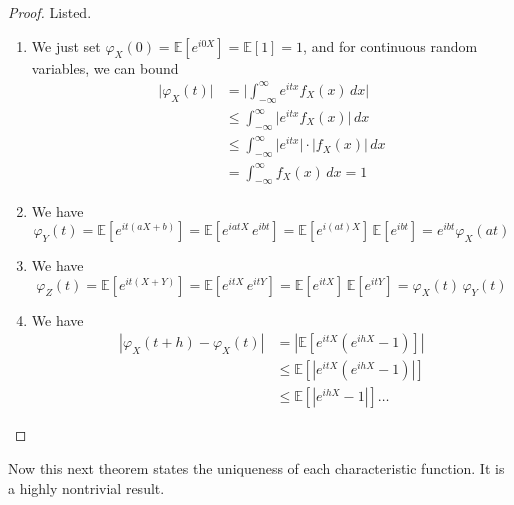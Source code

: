 \documentclass{article}
\begin{document}
      \begin{proof}
        Listed. 
        \begin{enumerate}
          \item We just set $\varphi_X (0) = \mathbb{E}[e^{i 0 X}] = \mathbb{E}[1] = 1$, and for continuous random variables, we can bound 
          \begin{align*}
            \big| \varphi_X (t) \big| & = \bigg| \int_{-\infty}^\infty e^{i t x} f_X (x) \,dx  \bigg| \\
            & \leq \int_{-\infty}^\infty \big| e^{i t x} f_X (x) \big| \,dx \\
            & \leq \int_{-\infty}^\infty \big| e^{i t x} \big| \cdot \big|f_X (x) \big| \,dx \\
            & = \int_{-\infty}^\infty f_X (x) \,dx = 1 
          \end{align*}
          
          \item We have 
          \begin{equation}
            \varphi_Y (t) = \mathbb{E}[ e^{i t (a X + b)}] = \mathbb{E}[ e^{i a t X} \, e^{i b t}] = \mathbb{E}[ e^{i (at) X}] \, \mathbb{E}[e^{i b t}] = e^{i b t} \varphi_X (a t)
          \end{equation}
          
          \item We have 
          \begin{equation}
            \varphi_Z (t) = \mathbb{E}[ e^{i t (X + Y)}] = \mathbb{E}[ e^{i t X} \, e^{i t Y}] = \mathbb{E}[e^{i t X}] \, \mathbb{E}[e^{i t Y}] = \varphi_X (t) \, \varphi_Y (t)
          \end{equation}
          
          \item We have 
          \begin{align*}
            | \varphi_X (t + h) - \varphi_X (t)| & = | \mathbb{E} [ e^{i tX} (e^{i h X} - 1)] | \\ 
            & \leq \mathbb{E}[ | e^{i tX} (e^{i h X} - 1)|] \\
            & \leq \mathbb{E}[ |e^{i h X} - 1|] \ldots
          \end{align*}
        \end{enumerate}
      \end{proof}

      Now this next theorem states the uniqueness of each characteristic function. It is a highly nontrivial result. 
\end{document}
